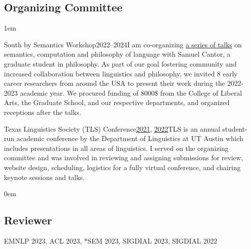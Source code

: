 \subsection{Organizing Committee}

\leftskip1em\relax

\smallentry
  {\large South by Semantics Workshop}{2022--2024}{I am co-organizing \href{https://sites.utexas.edu/sxsemantics/}{a series of talks} on semantics, computation and philosophy of language with Samuel Cantor, a graduate student in philosophy. As part of our goal fostering community and increased collaboration between linguistics and philosophy, we invited 8 early career researchers from around the USA to present their work during the 2022-2023 academic year. We procured funding of 8000\$ from the College of Liberal Arts, the Graduate School, and our respective departments, and organized receptions after the talks.}
  
\smallentry
    {\large Texas Linguistics Society (TLS) Conference}{\href{http://tls.ling.utexas.edu/2021/}{2021}, \href{http://tls.ling.utexas.edu/2022/}{2022}}{TLS is an annual student-run academic conference by the Department of Linguistics at UT Austin which includes presentations in all areas of linguistics. I served on the organizing committee and was involved in reviewing and assigning submissions for review, website design, scheduling, logistics for a fully virtual conference, and chairing keynote sessions and talks.}

\leftskip0em\relax

\subsection{Reviewer}

\quad EMNLP 2023, ACL 2023, *SEM 2023, SIGDIAL 2023, SIGDIAL 2022

